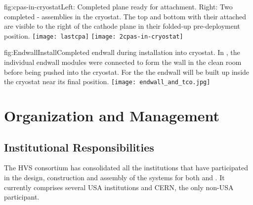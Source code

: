 
\begin{dunefigure}{fig:cpas-in-cryostat}{Left: Completed   plane ready for  attachment. Right: Two completed - assemblies in the  cryostat. The top and bottom  with their  attached are visible to the right of the cathode plane in their folded-up pre-deployment position.}
\texttt{[image: lastcpa]}
\texttt{[image: 2cpas-in-cryostat]}
\end{dunefigure}

\begin{dunefigure}{fig:EndwallInstall}{Completed endwall %
during installation into  cryostat. In %
, the individual endwall modules were connected to form the wall in the clean room before being pushed into the cryostat. %
For the  the endwall will be built up inside the cryostat near its final position.}
\texttt{[image: endwall\_and\_tco.jpg]}
\end{dunefigure}


\clearpage
\section{Organization and Management}
\label{sec:fdsp-hv-org}


\subsection{Institutional Responsibilities}
\label{sec:fdsp-hv-org-consortium}
The HVS consortium has consolidated 
all the institutions that have participated in the design, construction and assembly of the  systems for both   and . 
%
It currently comprises several USA institutions and CERN, %
the only non-USA participant.  
 
